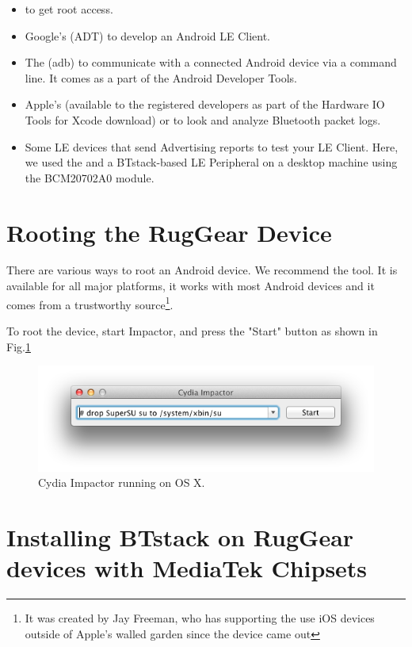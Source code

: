 \documentclass[a4paper,titlepage,oneside,12pt]{amsart} %
\begin{document}
\begin{itemize}
\item \CydiaImpactor{} to get root access.
\item Google's \ADT{} (ADT) to develop an Android LE Client. 
\item The \adb{} (adb) to communicate with a connected Android device via a command line. It comes as a part of the Android Developer Tools.
\item Apple's \PacketLogger{} (available to the registered developers as part of the Hardware IO Tools for Xcode download) or \Wireshark{} to look and analyze Bluetooth packet logs.
\item Some LE devices that send Advertising reports to test your LE Client. Here, we used the \nio{} and a BTstack-based LE Peripheral on a desktop machine using the BCM20702A0 module.
\end{itemize}

\section{Rooting the RugGear Device}
There are various ways to root an Android device. We recommend the \CydiaImpactorURL{} tool. It is available for all major platforms, it works with most Android devices and it comes from a trustworthy source\footnote{It was created by Jay Freeman, who has supporting the use iOS devices outside of Apple's walled garden since the device came out}. 

To root the device, start Impactor, and press the "Start" button as shown in Fig.\ref{fig:cydiaimpactor} 

\begin{figure}[htbp]
\begin{center}
 \includegraphics[width=\textwidth]{picts/cydiaimpactor.png} 
\caption{Cydia Impactor running on OS X.}
\label{fig:cydiaimpactor}
\end{center}
\end{figure}

\section{Installing BTstack on RugGear devices with MediaTek Chipsets}
\end{document}
